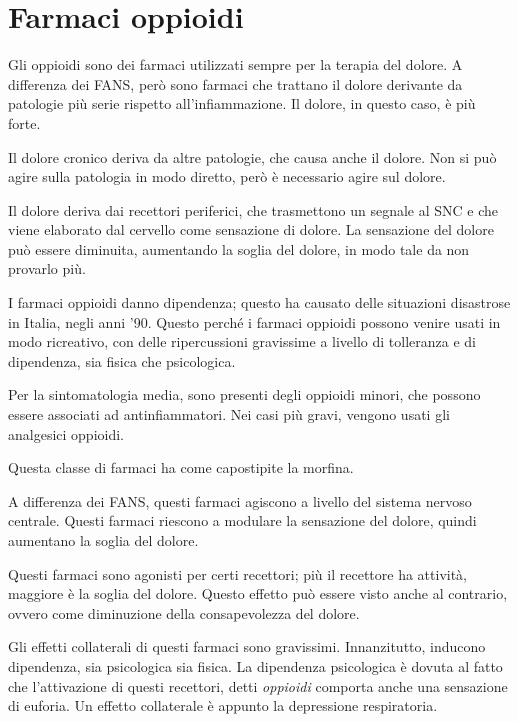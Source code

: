 \chapter{Farmaci oppioidi}

Gli oppioidi sono dei farmaci utilizzati sempre per la terapia del
dolore. A differenza dei FANS, però sono farmaci che trattano il dolore
derivante da patologie più serie rispetto all'infiammazione. Il dolore,
in questo caso, è più forte.

Il dolore cronico deriva da altre patologie, che causa anche il dolore.
Non si può agire sulla patologia in modo diretto, però è necessario
agire sul dolore.


Il dolore deriva dai recettori periferici, che trasmettono un segnale al
SNC e che viene elaborato dal cervello come sensazione di dolore. La
sensazione del dolore può essere diminuita, aumentando la soglia del
dolore, in modo tale da non provarlo più.

I farmaci oppioidi danno dipendenza; questo ha causato delle situazioni
disastrose in Italia, negli anni '90. Questo perché i farmaci oppioidi
possono venire usati in modo ricreativo, con delle ripercussioni
gravissime a livello di tolleranza e di dipendenza, sia fisica che
psicologica.

Per la sintomatologia media, sono presenti degli oppioidi minori, che
possono essere associati ad antinfiammatori. Nei casi più gravi, vengono
usati gli analgesici oppioidi.

Questa classe di farmaci ha come capostipite la morfina.

A differenza dei FANS, questi farmaci agiscono a livello del sistema
nervoso centrale. Questi farmaci riescono a modulare la sensazione del
dolore, quindi aumentano la soglia del dolore.

Questi farmaci sono agonisti per certi recettori; più il recettore ha
attività, maggiore è la soglia del dolore. Questo effetto può essere
visto anche al contrario, ovvero come diminuzione della consapevolezza
del dolore.

Gli effetti collaterali di questi farmaci sono gravissimi. Innanzitutto,
inducono dipendenza, sia psicologica sia fisica. La dipendenza
psicologica è dovuta al fatto che l'attivazione di questi recettori,
detti \emph{oppioidi} comporta anche una sensazione di
euforia.
Un effetto collaterale è appunto la depressione respiratoria.


